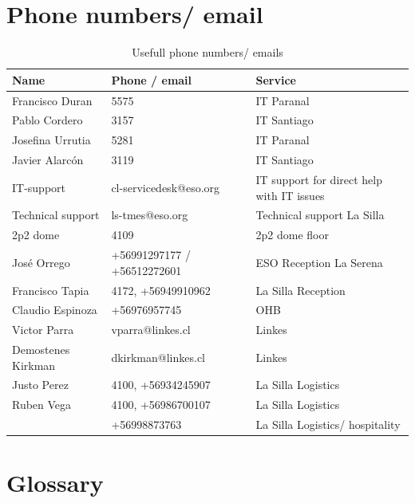\documentclass[11pt,fleqn,a4paper]{book}
\begin{document}
\section{Phone numbers/ email}
\begin{table}
\caption{Usefull phone numbers/ emails}
\label{tab:phone}
\centering
\begin{tabular}{lll}
\hline
Name                    &  Phone / email                                           & Service\\
\hline\hline
Francisco Duran	        & 5575                                              & IT Paranal \\
Pablo Cordero           & 3157                                              & IT Santiago \\
Josefina Urrutia        & 5281                                              & IT Paranal \\
Javier Alarc\'on        & 3119                                              & IT Santiago \\
IT-support              & cl-servicedesk@eso.org                            & IT support for direct help with IT issues\\
Technical support       & ls-tmes@eso.org                                   & Technical support La Silla  \\
 2p2 dome               & 4109                                              & 2p2 dome floor\\
 Jos\'e Orrego          & +56991297177 / +56512272601                       & ESO Reception La Serena\\
 Francisco Tapia        & 4172, +56949910962                                & La Silla Reception\\
 Claudio Espinoza       & +56976957745                                      & OHB   \\
 Victor Parra           & vparra@linkes.cl                                  & Linkes \\
 Demostenes  Kirkman    &  dkirkman@linkes.cl                               & Linkes \\
 Justo Perez            & 4100, +56934245907                                & La Silla Logistics\\
 Ruben Vega             & 4100, +56986700107                                & La Silla Logistics\\
                        & +56998873763                                      & La Silla Logistics/ hospitality\\
 \hline
\end{tabular}
\end{table}


\section{Glossary}
\printglossaries
{}
\end{document}
